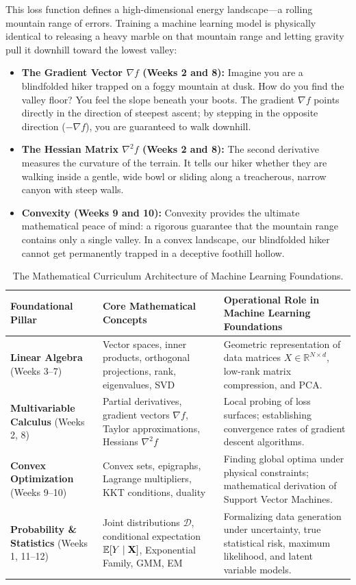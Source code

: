 \begin{enumerate}
    This loss function defines a high-dimensional energy landscape—a rolling mountain range of errors. Training a machine learning model is physically identical to releasing a heavy marble on that mountain range and letting gravity pull it downhill toward the lowest valley:
    \begin{itemize}
        \item \textbf{The Gradient Vector $\nabla f$ (Weeks 2 and 8):} Imagine you are a blindfolded hiker trapped on a foggy mountain at dusk. How do you find the valley floor? You feel the slope beneath your boots. The gradient $\nabla f$ points directly in the direction of steepest ascent; by stepping in the opposite direction ($-\nabla f$), you are guaranteed to walk downhill.
        \item \textbf{The Hessian Matrix $\nabla^2 f$ (Weeks 2 and 8):} The second derivative measures the curvature of the terrain. It tells our hiker whether they are walking inside a gentle, wide bowl or sliding along a treacherous, narrow canyon with steep walls.
        \item \textbf{Convexity (Weeks 9 and 10):} Convexity provides the ultimate mathematical peace of mind: a rigorous guarantee that the mountain range contains only a single valley. In a convex landscape, our blindfolded hiker cannot get permanently trapped in a deceptive foothill hollow.
    \end{itemize}
\end{enumerate}

\begin{table}[htbp]
\centering
\small
\begin{tabularx}{\textwidth}{lXX}
\toprule
\textbf{Foundational Pillar} & \textbf{Core Mathematical Concepts} & \textbf{Operational Role in Machine Learning Foundations} \\
\midrule
\textbf{Linear Algebra} (Weeks 3--7) & Vector spaces, inner products, orthogonal projections, rank, eigenvalues, SVD & Geometric representation of data matrices $X \in \mathbb{R}^{N \times d}$, low-rank matrix compression, and PCA. \\
\addlinespace
\textbf{Multivariable Calculus} (Weeks 2, 8) & Partial derivatives, gradient vectors $\nabla f$, Taylor approximations, Hessians $\nabla^2 f$ & Local probing of loss surfaces; establishing convergence rates of gradient descent algorithms. \\
\addlinespace
\textbf{Convex Optimization} (Weeks 9--10) & Convex sets, epigraphs, Lagrange multipliers, KKT conditions, duality & Finding global optima under physical constraints; mathematical derivation of Support Vector Machines. \\
\addlinespace
\textbf{Probability \& Statistics} (Weeks 1, 11--12) & Joint distributions $\mathcal{D}$, conditional expectation $\operatorname{\mathbb{E}}[Y \mid \mathbf{X}]$, Exponential Family, GMM, EM & Formalizing data generation under uncertainty, true statistical risk, maximum likelihood, and latent variable models. \\
\bottomrule
\end{tabularx}
\caption{The Mathematical Curriculum Architecture of Machine Learning Foundations.}
\label{tab:w01_curriculum_map}
\end{table}

